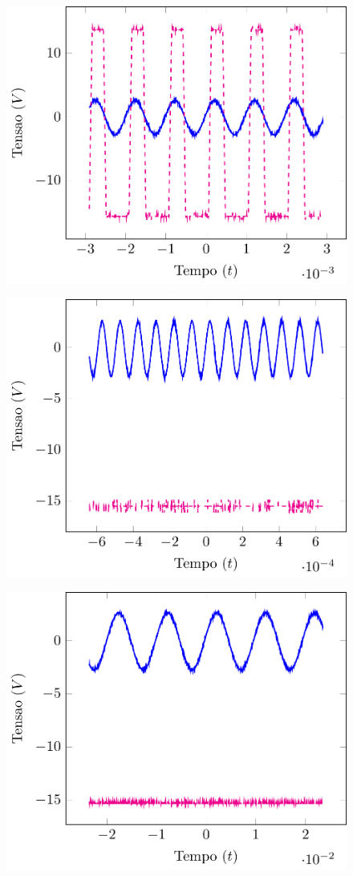 \documentclass[12pt,a4paper]{article}
\begin{document}
\begin{figure}[htpb]
  \centering
  \includegraphics[width=0.8\linewidth]{./img/1V_1K.pdf}
  \label{1V1K}
\end{figure}
\begin{figure}[htpb]
  \centering
  \includegraphics[width=0.8\linewidth]{./img/1V_100K.pdf}
  \label{1V100K}
\end{figure}
\begin{figure}[htpb]
  \centering
  \includegraphics[width=0.8\linewidth]{./img/4V_100.pdf}
  \label{4V100}
\end{figure}
\end{document}
